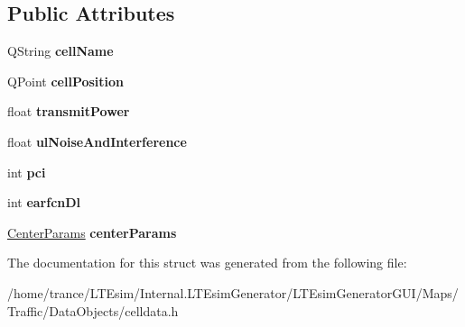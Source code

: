 \subsection*{Public Attributes}
\begin{DoxyCompactItemize}
\item 
Q\+String {\bfseries cell\+Name}\hypertarget{struct_cell_params_a683f32d70a8f1e0a364fab6537c99de2}{}\label{struct_cell_params_a683f32d70a8f1e0a364fab6537c99de2}

\item 
Q\+Point {\bfseries cell\+Position}\hypertarget{struct_cell_params_a7411bd09eae01c50074afc983c36510f}{}\label{struct_cell_params_a7411bd09eae01c50074afc983c36510f}

\item 
float {\bfseries transmit\+Power}\hypertarget{struct_cell_params_adbec6f87448137812039080c464f0fee}{}\label{struct_cell_params_adbec6f87448137812039080c464f0fee}

\item 
float {\bfseries ul\+Noise\+And\+Interference}\hypertarget{struct_cell_params_a3aedfa515c2024ef0837d68f25675bd4}{}\label{struct_cell_params_a3aedfa515c2024ef0837d68f25675bd4}

\item 
int {\bfseries pci}\hypertarget{struct_cell_params_af743090f488d8a21de0c0c54b32344e0}{}\label{struct_cell_params_af743090f488d8a21de0c0c54b32344e0}

\item 
int {\bfseries earfcn\+Dl}\hypertarget{struct_cell_params_acd36b0442e14509df10b16e2e6aa811a}{}\label{struct_cell_params_acd36b0442e14509df10b16e2e6aa811a}

\item 
\hyperlink{struct_center_params}{Center\+Params} {\bfseries center\+Params}\hypertarget{struct_cell_params_a431944f5cdb2a391387a7a01157e4941}{}\label{struct_cell_params_a431944f5cdb2a391387a7a01157e4941}

\end{DoxyCompactItemize}


The documentation for this struct was generated from the following file\+:\begin{DoxyCompactItemize}
\item 
/home/trance/\+L\+T\+Esim/\+Internal.\+L\+T\+Esim\+Generator/\+L\+T\+Esim\+Generator\+G\+U\+I/\+Maps/\+Traffic/\+Data\+Objects/celldata.\+h\end{DoxyCompactItemize}
